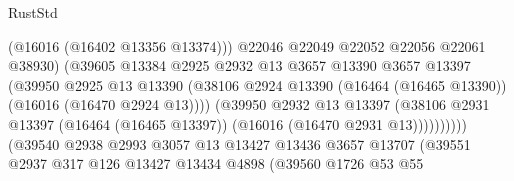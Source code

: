 \begin{lexlean}{RustStd}
\begin{coremodule}
                                            (@16016 (@16402 @13356 @13374)))
                                          @22046
                                          @22049
                                          @22052
                                          @22056
                                          @22061
                                          @38930)
                                        (@39605
                                          @13384
                                          @2925
                                          @2932
                                          @13
                                          @3657
                                          @13390
                                          @3657
                                          @13397
                                          (@39950
                                            @2925
                                            @13
                                            @13390
                                            (@38106
                                              @2924
                                              @13390
                                              (@16464 (@16465 @13390))
                                              (@16016 (@16470 @2924 @13))))
                                          (@39950
                                            @2932
                                            @13
                                            @13397
                                            (@38106
                                              @2931
                                              @13397
                                              (@16464 (@16465 @13397))
                                              (@16016 (@16470 @2931 @13))))))))))
                              (@39540
                                @2938
                                @2993
                                @3057
                                @13
                                @13427
                                @13436
                                @3657
                                @13707
                                (@39551
                                  @2937
                                  @317
                                  @126
                                  @13427
                                  @13434
                                  @4898
                                  (@39560
                                    @1726
                                    @53
                                    @55

\end{coremodule}
\end{lexlean}

